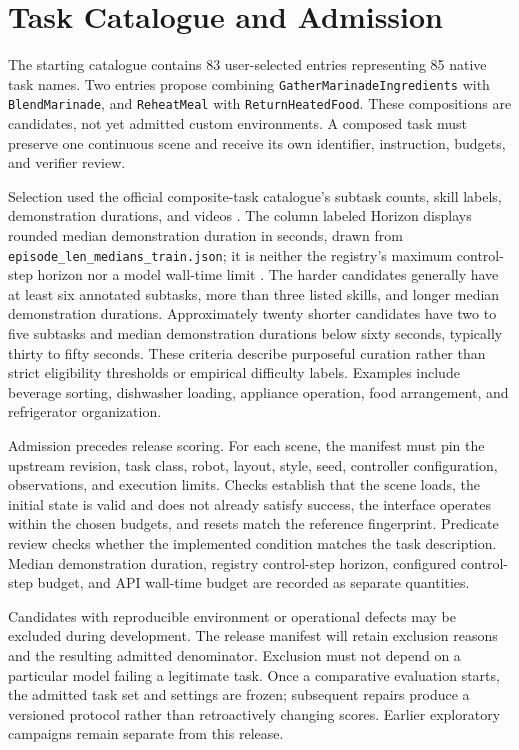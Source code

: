 \documentclass[11pt]{article}
\begin{document}
\section{Task Catalogue and Admission}
The starting catalogue contains 83 user-selected entries representing 85 native task names. Two entries propose combining \texttt{GatherMarinadeIngredients} with \texttt{BlendMarinade}, and \texttt{ReheatMeal} with \texttt{ReturnHeatedFood}. These compositions are candidates, not yet admitted custom environments. A composed task must preserve one continuous scene and receive its own identifier, instruction, budgets, and verifier review.

Selection used the official composite-task catalogue's subtask counts, skill labels, demonstration durations, and videos \cite{taskcatalogue}. The column labeled Horizon displays rounded median demonstration duration in seconds, drawn from \texttt{episode\_len\_medians\_train.json}; it is neither the registry's maximum control-step horizon nor a model wall-time limit \cite{demodurations}. The harder candidates generally have at least six annotated subtasks, more than three listed skills, and longer median demonstration durations. Approximately twenty shorter candidates have two to five subtasks and median demonstration durations below sixty seconds, typically thirty to fifty seconds. These criteria describe purposeful curation rather than strict eligibility thresholds or empirical difficulty labels. Examples include beverage sorting, dishwasher loading, appliance operation, food arrangement, and refrigerator organization.

Admission precedes release scoring. For each scene, the manifest must pin the upstream revision, task class, robot, layout, style, seed, controller configuration, observations, and execution limits. Checks establish that the scene loads, the initial state is valid and does not already satisfy success, the interface operates within the chosen budgets, and resets match the reference fingerprint. Predicate review checks whether the implemented condition matches the task description. Median demonstration duration, registry control-step horizon, configured control-step budget, and API wall-time budget are recorded as separate quantities.

Candidates with reproducible environment or operational defects may be excluded during development. The release manifest will retain exclusion reasons and the resulting admitted denominator. Exclusion must not depend on a particular model failing a legitimate task. Once a comparative evaluation starts, the admitted task set and settings are frozen; subsequent repairs produce a versioned protocol rather than retroactively changing scores. Earlier exploratory campaigns remain separate from this release.
\end{document}
